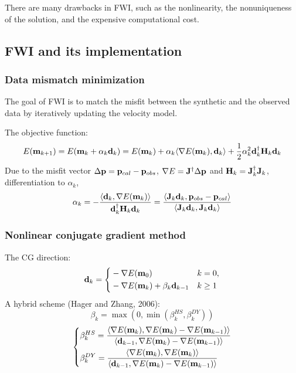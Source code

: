 There are many drawbacks in FWI, such as the nonlinearity,
the nonuniqueness of the solution, and the expensive computational cost.

\subsection{FWI and its implementation}

\subsubsection{Data mismatch minimization}
The goal of FWI is to match the misfit between the synthetic and
the observed data by iteratively updating the velocity model.

The objective function:
\[ E(\mathbf{m}_{k+1}) = E(\mathbf{m}_k+\alpha_k\mathbf{d}_k) = E(\mathbf{m}_k) +
  \alpha_k\langle\nabla E(\mathbf{m}_k),\mathbf{d}_k\rangle +
  \frac{1}{2}\alpha_k^2\mathbf{d}_k^\dagger\mathbf{H}_k\mathbf{d}_k \]
Due to the misfit vector $\Delta\mathbf{p}=\mathbf{p}_{cal}-\mathbf{p}_{obs}$,
$\nabla E=\mathbf{J}^\dagger\Delta\mathbf{p}$ and $\mathbf{H}_k=\mathbf{J}_k^\dagger\mathbf{J}_k$,
differentiation to $\alpha_k$,
\[ \alpha_k = -\frac{\langle\mathbf{d}_k, \nabla E(\mathbf{m}_k)\rangle}
  {\mathbf{d}_k^\dagger\mathbf{H}_k\mathbf{d}_k} =
  \frac{\langle\mathbf{J}_k\mathbf{d}_k, \mathbf{p}_{obs}-\mathbf{p}_{cal}\rangle}
  {\langle\mathbf{J}_k\mathbf{d}_k, \mathbf{J}_k\mathbf{d}_k\rangle} \]

\subsubsection{Nonlinear conjugate gradient method}
The CG direction:
\[ \mathbf{d}_k=\left\{
  \begin{aligned}
    & -\nabla E(\mathbf{m}_0) & & k=0, \\
    & -\nabla E(\mathbf{m}_k)+\beta_k\mathbf{d}_{k-1} & & k\geq 1
  \end{aligned} \right. \]
A hybrid scheme (Hager and Zhang, 2006):
\[ \beta_k = \max(0,\min(\beta_k^{HS},\beta_k^{DY})) \]
\[ \left\{
  \begin{aligned}
    & \beta_k^{HS}=\frac{\langle\nabla E(\mathbf{m}_k), \nabla E(\mathbf{m}_k)-\nabla E(\mathbf{m}_{k-1})\rangle}
      {\langle\mathbf{d}_{k-1},\nabla E(\mathbf{m}_k)-\nabla E(\mathbf{m}_{k-1})\rangle} \\
    & \beta_k^{DY}=\frac{\langle\nabla E(\mathbf{m}_k), \nabla E(\mathbf{m}_k)\rangle}
      {\langle\mathbf{d}_{k-1},\nabla E(\mathbf{m}_k)-\nabla E(\mathbf{m}_{k-1})\rangle}
  \end{aligned} \right. \]

